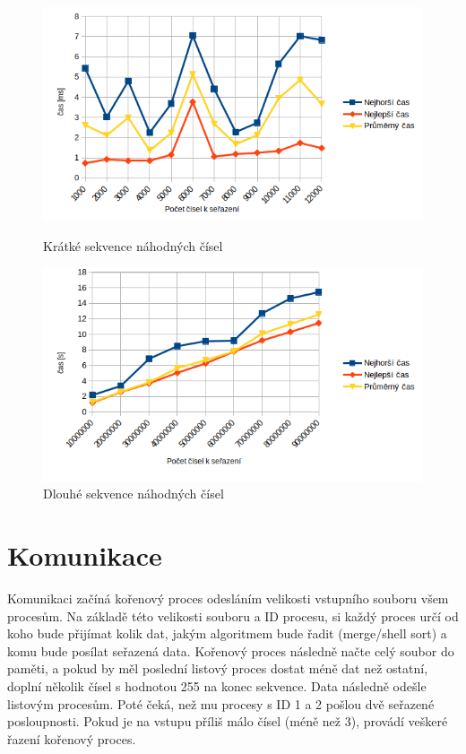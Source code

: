 \documentclass[11pt,a4paper,titlepage]{article}
\begin{document}
        \begin{figure}[htbp]
            \begin{minipage}{.5\textwidth}
                \centering
                \includegraphics[width=1\linewidth]{small.png}
                \caption{Krátké sekvence náhodných čísel}
            \end{minipage}
            \begin{minipage}{.5\textwidth}
                \centering
                \includegraphics[width=1\linewidth]{big_numbers.png}
                \caption{Dlouhé sekvence náhodných čísel}
            \end{minipage}
        \end{figure}

	\section{Komunikace}
        Komunikaci začíná kořenový proces odesláním velikosti vstupního souboru všem procesům. Na základě této velikosti souboru a ID procesu, si každý 
        proces určí od koho bude přijímat kolik dat, jakým algoritmem bude řadit (merge/shell sort) a komu bude posílat seřazená data. Kořenový proces
        následně načte celý soubor do paměti,  a pokud by měl poslední listový proces dostat
        méně dat než ostatní, doplní několik čísel s hodnotou 255 na konec sekvence. Data následně odešle listovým procesům. Poté čeká, než mu procesy s ID 1 a 2 
        pošlou dvě seřazené posloupnosti. Pokud je na vstupu příliš málo čísel (méně než 3), provádí veškeré řazení kořenový proces.
\end{document}
